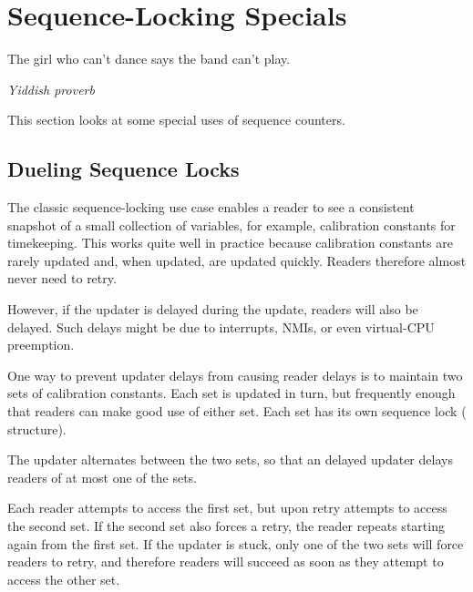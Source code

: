 
\section{Sequence-Locking Specials}
\label{sec:together:Sequence-Locking Specials}
%
\epigraph{The girl who can't dance says the band can't play.}
	 {\emph{Yiddish proverb}}

This section looks at some special uses of sequence counters.

\subsection{Dueling Sequence Locks}
\label{sec:together:Dueling Sequence Locks}

The classic sequence-locking use case enables a reader to see a consistent
snapshot of a small collection of variables, for example, calibration
constants for timekeeping.
This works quite well in practice because calibration constants are
rarely updated and, when updated, are updated quickly.
Readers therefore almost never need to retry.

However, if the updater is delayed during the update, readers will
also be delayed.
Such delays might be due to interrupts, NMIs, or even
virtual-CPU preemption.

One way to prevent updater delays from causing reader delays is to
maintain two sets of calibration constants.
Each set is updated in turn, but frequently enough that readers can
make good use of either set.
Each set has its own sequence lock ( structure).

The updater alternates between the two sets, so that an delayed updater
delays readers of at most one of the sets.

Each reader attempts to access the first set, but upon retry attempts
to access the second set.
If the second set also forces a retry, the reader repeats starting
again from the first set.
If the updater is stuck, only one of the two sets will force
readers to retry, and therefore readers will succeed as soon as
they attempt to access the other set.

\QuickQuizEnd

